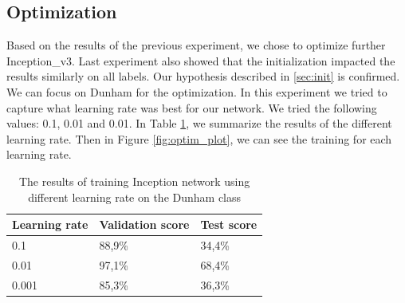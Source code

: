 \subsection{Optimization}
Based on the results of the previous experiment, we chose to optimize further Inception\_v3. Last experiment also showed that the initialization impacted the results similarly on all labels. Our hypothesis described in \ref{sec:init} is confirmed. We can focus on Dunham for the optimization.
In this experiment we tried to capture what learning rate was best for our network. We tried the following values: 0.1, 0.01 and 0.01. In Table \ref{tab:optimlr}, we summarize the results of the different learning rate. Then in Figure \ref{fig:optim_plot}, we can see the training for each learning rate. 

\begin{table}
\caption{\label{tab:optimlr} The results of training Inception network using different learning rate on the Dunham class}
\centering
\begin{tabular}[b]{| l | l | l |}
\hline
    Learning rate & Validation score  & Test score\\ \hline
    0.1  &  88,9\%  & 34,4\% \\ \hline
    0.01 & 97,1\% &  68,4\%\\ \hline
    0.001 & 85,3\% &  36,3\% \\ \hline
\end{tabular} 
\end{table}

